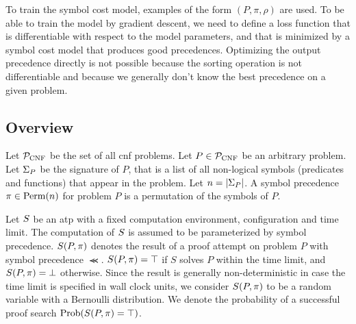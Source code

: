 To train the symbol cost model,
examples of the form $(P, \pi, \rho)$ are used.
To be able to train the model by gradient descent,
we need to define a loss function that is differentiable with respect to the model parameters,
and that is minimized by a symbol cost model that produces good precedences.
Optimizing the output precedence directly is not possible
because the sorting operation is not differentiable
and because we generally don't know the best precedence on a given problem.


\subsection{Overview}

Let $\operatorname{\mathcal{P}_{\mathrm{CNF}}}$ be the set of all \gls{cnf} problems.
Let $P \in \operatorname{\mathcal{P}_{\mathrm{CNF}}}$ be an arbitrary problem.
Let $\Sigma_P$ be the signature of $P$, that is a list of all non-logical symbols (predicates and functions)
that appear in the problem.
Let $n = \left|\Sigma_P\right|$.
A symbol precedence $\pi \in \mathrm{Perm}(n)$ for problem $P$ is a permutation of the symbols of $P$.

Let $S$ be an \gls{atp} with a fixed computation environment, configuration and time limit.
The computation of $S$ is assumed to be parameterized by symbol precedence.
$S(P, \pi)$ denotes the result of a proof attempt on problem $P$ with symbol precedence $\Prec$.
$S(P, \pi) = \top$ if $S$ solves $P$ within the time limit, and $S(P, \pi) = \bot$ otherwise.
Since the result is generally non-deterministic in case the time limit is specified in wall clock units,
we consider $S(P, \pi)$ to be a random variable with a Bernoulli distribution.
We denote the probability of a successful proof search $\mathrm{Prob}(S(P, \pi) = \top)$.

